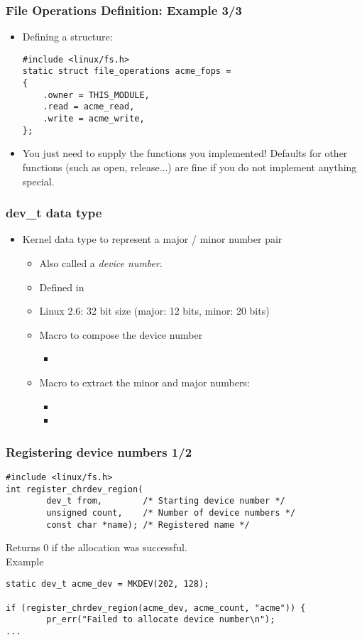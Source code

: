 \begin{frame}[fragile]
  \frametitle{File Operations Definition: Example 3/3}
  \begin{itemize}
  \item Defining a  structure:
\begin{verbatim}
#include <linux/fs.h>
static struct file_operations acme_fops =
{
    .owner = THIS_MODULE,
    .read = acme_read,
    .write = acme_write,
};
\end{verbatim}
  \item You just need to supply the functions you implemented!
    Defaults for other functions (such as open, release...) are fine
    if you do not implement anything special.
  \end{itemize}
\end{frame}

\begin{frame}
  \frametitle{dev\_t data type}
  \begin{itemize}
  \item Kernel data type to represent a major / minor number pair
    \begin{itemize}
    \item Also called a \emph{device number}.
    \item Defined in 
    \item Linux 2.6: 32 bit size (major: 12 bits, minor: 20 bits)
    \item Macro to compose the device number
      \begin{itemize}
      \item {}
      \end{itemize}
    \item Macro to extract the minor and major numbers:
      \begin{itemize}
      \item {}
      \item {}
      \end{itemize}
  \end{itemize}
\end{itemize}
\end{frame}

\begin{frame}[fragile]
  \frametitle{Registering device numbers 1/2}
\begin{verbatim}
#include <linux/fs.h>
int register_chrdev_region(
        dev_t from,        /* Starting device number */
        unsigned count,    /* Number of device numbers */
        const char *name); /* Registered name */
\end{verbatim}
Returns 0 if the allocation was successful.\\
Example
\begin{verbatim}
static dev_t acme_dev = MKDEV(202, 128);

if (register_chrdev_region(acme_dev, acme_count, "acme")) {
        pr_err("Failed to allocate device number\n");
...
\end{verbatim}
\end{frame}

